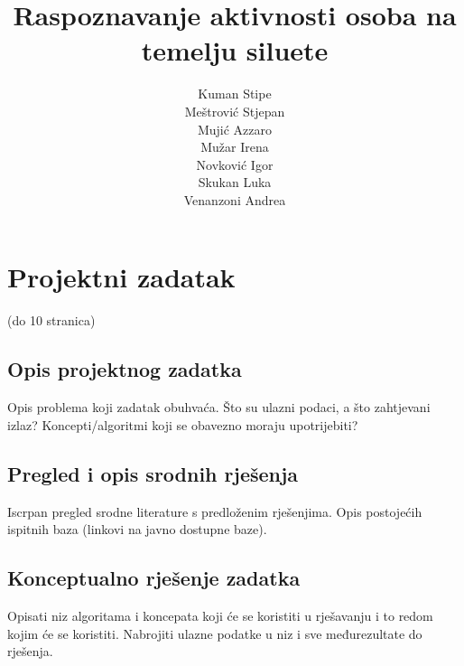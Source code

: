 \documentclass[times, utf8, diplomski]{fer}
\begin{document}
\title{ Raspoznavanje aktivnosti osoba na temelju siluete }


\author{ \begin{tabular}{ l }
	Kuman Stipe \\
	Meštrović Stjepan \\
	Mujić Azzaro \\
	Mužar Irena \\
	Novković Igor \\
	Skukan Luka \\
	Venanzoni Andrea \\
\end{tabular}  }

\maketitle

\zahvala{}

\tableofcontents


\chapter{Projektni zadatak}

(do 10 stranica)

\section{Opis projektnog zadatka}

Opis problema koji zadatak obuhvaća. Što su ulazni podaci, a što zahtjevani izlaz? Koncepti/algoritmi koji se obavezno moraju upotrijebiti?

\section{Pregled i opis srodnih rješenja}

Iscrpan pregled srodne literature s predloženim rješenjima. Opis postojećih ispitnih baza (linkovi na javno dostupne baze).

\section{Konceptualno rješenje zadatka}

Opisati niz algoritama i koncepata koji će se koristiti u rješavanju i to redom kojim će se koristiti. Nabrojiti ulazne podatke u niz i sve međurezultate do rješenja.
\end{document}
